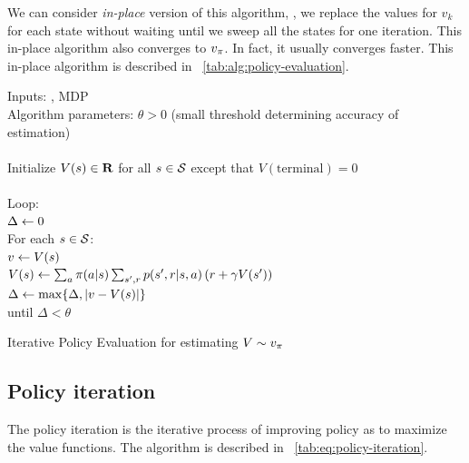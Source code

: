 We can consider \emph{in-place} version of this algorithm,
\ie, we replace the values for $v_k$ for each state without waiting until we sweep all the states for one iteration.
This in-place algorithm also converges to $v_{\pi}$.
In fact, it usually converges faster.
This in-place algorithm is described in \tablename~\ref{tab:alg:policy-evaluation}.


\begin{table}
\beginalg
Inputs: \pol, MDP \\
Algorithm parameters: $\theta > 0$ (small threshold determining accuracy of estimation)\\
\\
Initialize $V(s) \in \mathbf{R}$ for all $s \in \mathcal{S}$ except that $V(\mathrm{terminal}) = 0$ \\
\\
 Loop: \\
 \> $\Delta \leftarrow 0$ \\
 \> For each $s\in\mathcal{S}$: \\
 \> \> $v\leftarrow V(s)$ \\
 \> \> $V(s) \leftarrow \sum_a \pi(a|s) \sum_{{s'}, r} p({s'}, r|s,a) \left( r + \gamma V({s'}) \right)$ \\
 \> \> $\Delta \leftarrow \max\{\Delta, |v-V(s)|\}$ \\
 until $\Delta < \theta$
\endalg
\caption{Iterative Policy Evaluation for estimating $V \sim v_{\pi}$}
\label{tab:alg:policy-evaluation}
\end{table}


\subsection{Policy iteration}

The policy iteration is the iterative process of improving policy as to maximize the value functions.
The algorithm is described in \tablename~\ref{tab:eq:policy-iteration}.

